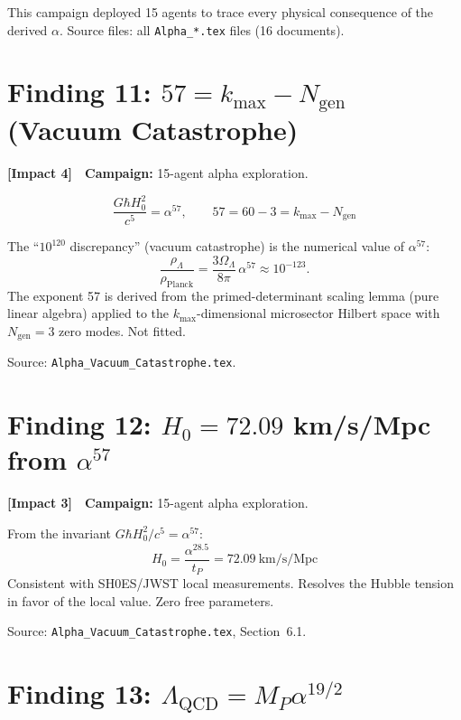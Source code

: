 \documentclass[11pt,a4paper]{article}
\newcommand{\impactfour}{\textcolor{impact4}{\textbf{[Impact 4]}}}
\newcommand{\impactthree}{\textcolor{impact3}{\textbf{[Impact 3]}}}
\begin{document}
This campaign deployed 15 agents to trace every physical consequence of
the derived $\alpha$. Source files: all \texttt{Alpha\_*.tex} files
(16 documents).


\section{Finding 11: $57 = k_{\max} - N_{\mathrm{gen}}$ (Vacuum Catastrophe)}
\label{sec:alpha57}

\impactfour\ \ \textbf{Campaign:} 15-agent alpha exploration.

\begin{equation}
\frac{G\hbar H_0^2}{c^5} = \alpha^{57}, \qquad 57 = 60 - 3 = k_{\max} - N_{\mathrm{gen}}
\end{equation}

The ``$10^{120}$ discrepancy'' (vacuum catastrophe) is the numerical value
of $\alpha^{57}$:
\[
\frac{\rho_\Lambda}{\rho_{\mathrm{Planck}}}
= \frac{3\Omega_\Lambda}{8\pi}\,\alpha^{57} \approx 10^{-123}.
\]
The exponent 57 is derived from the primed-determinant scaling lemma
(pure linear algebra) applied to the $k_{\max}$-dimensional microsector
Hilbert space with $N_{\mathrm{gen}} = 3$ zero modes. Not fitted.

Source: \texttt{Alpha\_Vacuum\_Catastrophe.tex}.


\section{Finding 12: $H_0 = 72.09$ km/s/Mpc from $\alpha^{57}$}
\label{sec:H0}

\impactthree\ \ \textbf{Campaign:} 15-agent alpha exploration.

From the invariant $G\hbar H_0^2/c^5 = \alpha^{57}$:
\[
H_0 = \frac{\alpha^{28.5}}{t_P} = 72.09~\text{km/s/Mpc}
\]
Consistent with SH0ES/JWST local measurements. Resolves the Hubble
tension in favor of the local value. Zero free parameters.

Source: \texttt{Alpha\_Vacuum\_Catastrophe.tex}, Section~6.1.


\section{Finding 13: $\Lambda_{\mathrm{QCD}} = M_P \alpha^{19/2}$}
\label{sec:Lambda-QCD}
\end{document}
